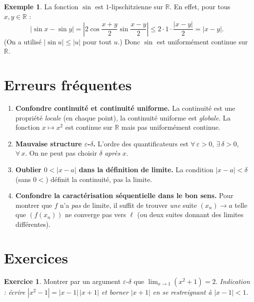 \documentclass[12pt,a4paper,openany]{book}
\theoremstyle{definition}
\newtheorem{exemple}{Exemple}[chapter]
\newtheorem{exercice}{Exercice}[chapter]
\newcommand{\R}{\mathbb{R}}
\begin{document}
\begin{exemple}\label{ex:sin-lipschitz}
La fonction $\sin$ est $1$-lipschitzienne sur $\R$. En effet, pour tous $x, y \in \R$ :
\[
  |\sin x - \sin y| = \left|2\cos\frac{x+y}{2}\sin\frac{x-y}{2}\right|
  \leqslant 2 \cdot 1 \cdot \frac{|x-y|}{2} = |x - y|.
\]
(On a utilisé $|\sin u| \leqslant |u|$ pour tout $u$.) Donc $\sin$ est uniformément continue sur $\R$.
\end{exemple}

\section{Erreurs fréquentes}\label{sec:erreurs-ch5}

\begin{enumerate}[label=\textbf{\arabic*.}]
  \item \textbf{Confondre continuité et continuité uniforme.} La continuité est une propriété \emph{locale} (en chaque point), la continuité uniforme est \emph{globale}. La fonction $x \mapsto x^2$ est continue sur $\R$ mais pas uniformément continue.

  \item \textbf{Mauvaise structure $\varepsilon$-$\delta$.} L'ordre des quantificateurs est $\forall\,\varepsilon > 0$, $\exists\,\delta > 0$, $\forall\,x$. On ne peut pas choisir $\delta$ \emph{après} $x$.

  \item \textbf{Oublier $0 < |x - a|$ dans la définition de limite.} La condition $|x - a| < \delta$ (sans $0 <$) définit la continuité, pas la limite.

  \item \textbf{Confondre la caractérisation séquentielle dans le bon sens.} Pour montrer que $f$ n'a \emph{pas} de limite, il suffit de trouver \emph{une} suite $(x_n) \to a$ telle que $(f(x_n))$ ne converge pas vers $\ell$ (ou deux suites donnant des limites différentes).
\end{enumerate}

\section{Exercices}\label{sec:exercices-ch5}

\begin{exercice}\label{exo:limite-x2+1}
Montrer par un argument $\varepsilon$-$\delta$ que $\displaystyle\lim_{x \to 1}(x^2 + 1) = 2$.
\textit{Indication : écrire $|x^2 - 1| = |x-1|\,|x+1|$ et borner $|x+1|$ en se restreignant à $|x-1| < 1$.}
\end{exercice}
\end{document}
